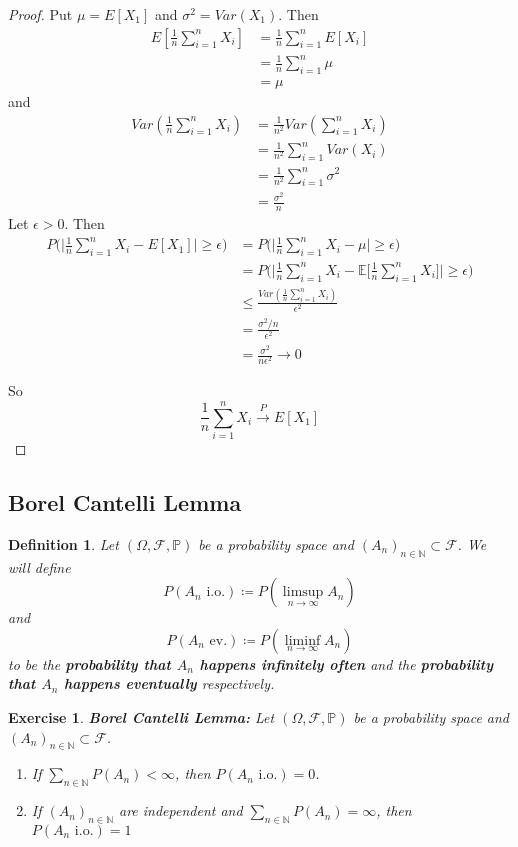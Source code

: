\documentclass[12pt]{amsart}
\newtheorem{defn}[thm]{Definition}
\newtheorem{ex}[thm]{Exercise}
\newcommand{\ep}{\epsilon}
\newcommand{\sig}{\sigma}
\newcommand{\Om}{\Omega}
\newcommand{\N}{\mathbb{N}}
\newcommand{\E}{\mathbb{E}}
\renewcommand{\P}{\mathbb{P}}
\newcommand{\MF}{\mathcal{F}}
\newcommand{\io}{\text{ i.o.}}
\newcommand{\ev}{\text{ ev.}}
\newcommand{\conv}[1]{\xrightarrow{#1}}
\begin{document}
	\begin{proof}
		Put $\mu = E[X_1]$ and $\sig^2 = Var(X_1)$. Then 
		\begin{align*}
			E[\frac{1}{n}\sum_{i=1}^n X_i] 
			&= \frac{1}{n} \sum_{i=1}^nE[X_i] \\
			&= \frac{1}{n} \sum_{i=1}^n \mu \\
			&= \mu
		\end{align*} and 
		\begin{align*}
			Var(\frac{1}{n}\sum_{i=1}^n X_i) 
			&= \frac{1}{n^2} Var(\sum_{i=1}^n X_i) \\
			&= \frac{1}{n^2} \sum_{i=1}^n Var(X_i) \\
			&= \frac{1}{n^2} \sum_{i=1}^n \sig^2 \\
			&= \frac{\sig^2}{n}
		\end{align*}
		Let $\ep >0$. Then 
		\begin{align*}
			P\bigg(\bigg \vert \frac{1}{n} \sum_{i=1}^n X_i - E[X_1] \bigg \vert \geq \ep \bigg) 
			& = P\bigg(\bigg\vert \frac{1}{n} \sum_{i=1}^n X_i - \mu \bigg\vert \geq \ep\bigg) \\
			& = P\bigg(\bigg\vert \frac{1}{n} \sum_{i=1}^n X_i - \E\bigg[\frac{1}{n}\sum_{i=1}^n X_i \bigg] \bigg\vert \geq \ep\bigg) \\ 
			&\leq \frac{Var(\frac{1}{n} \sum_{i=1}^n X_i)}{\ep^2} \\
			& =  \frac{\sig^2 / n}{\ep^2} \\
			&= \frac{\sig^2}{n\ep^2} \rightarrow 0
		\end{align*}
		
		So $$\frac{1}{n}\sum_{i=1}^n X_i \conv{P} E[X_1]$$
	\end{proof}
	
	\subsection{Borel Cantelli Lemma} 
	
	\begin{defn}
		Let $(\Om, \MF, \P)$ be a probability space and $(A_n)_{n \in \N} \subset \MF$. We will define $$P(A_n \io) \coloneqq P(\limsup_{n \rightarrow \infty}A_n) $$ and $$P(A_n \ev) \coloneqq P(\liminf_{n \rightarrow \infty} A_n)$$ to be the \textbf{probability that $A_n$ happens infinitely often} and the \textbf{probability that $A_n$ happens eventually} respectively.  
	\end{defn}
	
	\begin{ex}\textbf{Borel Cantelli Lemma:}
		Let $(\Om, \MF, \P)$ be a probability space and $(A_n)_{n \in \N} \subset \MF$.
		\begin{enumerate}
			\item If $\sum\limits_{n \in \N}P(A_n) < \infty$, then $P(A_n \io) = 0$.
			\item If $(A_n)_{n \in \N}$ are independent and $\sum\limits_{n \in \N} P(A_n) = \infty$, then $P(A_n \io) = 1$  
		\end{enumerate}
	\end{ex}
	
\end{document}
